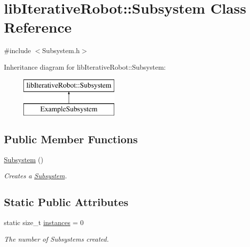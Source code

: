 \hypertarget{classlib_iterative_robot_1_1_subsystem}{}\section{lib\+Iterative\+Robot\+::Subsystem Class Reference}
\label{classlib_iterative_robot_1_1_subsystem}


{\ttfamily \#include $<$Subsystem.\+h$>$}

Inheritance diagram for lib\+Iterative\+Robot\+::Subsystem\+:\begin{figure}[H]
\begin{center}
\leavevmode
\includegraphics[height=2.000000cm]{classlib_iterative_robot_1_1_subsystem}
\end{center}
\end{figure}
\subsection*{Public Member Functions}
\begin{DoxyCompactItemize}
\item 
\mbox{\hyperlink{classlib_iterative_robot_1_1_subsystem_abdec44abe9ddba76f65abb02f8f62992}{Subsystem}} ()
\begin{DoxyCompactList}\small\item\em Creates a \mbox{\hyperlink{classlib_iterative_robot_1_1_subsystem}{Subsystem}}. \end{DoxyCompactList}\end{DoxyCompactItemize}
\subsection*{Static Public Attributes}
\begin{DoxyCompactItemize}
\item 
\mbox{\label{classlib_iterative_robot_1_1_subsystem_a8520e50bb977676222daa241e757ab33}} 
static size\+\_\+t \mbox{\hyperlink{classlib_iterative_robot_1_1_subsystem_a8520e50bb977676222daa241e757ab33}{instances}} = 0
\begin{DoxyCompactList}\small\item\em The number of Subsystems created. \end{DoxyCompactList}\end{DoxyCompactItemize}
